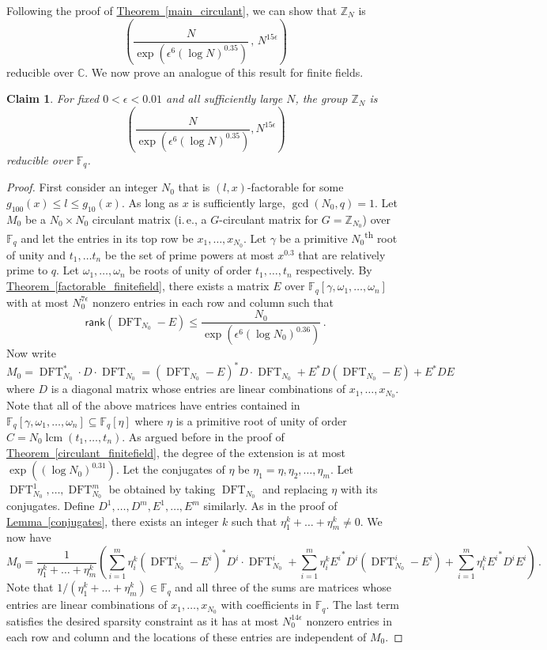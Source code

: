 \documentclass[11pt]{article}
\numberwithin{equation}{section}
\newtheorem{claim}[theorem]{Claim}
\theoremstyle{definition}
\theoremstyle{plain}
\newcommand{\C}{\mathbb C}
\newcommand{\Z}{\mathbb Z}
\newcommand{\ie}{i.\,e.}
\newcommand{\expref}[2]{\hyperref[#2]{#1~\ref{#2}}}
\theoremstyle{definition}
\newcommand\F{{\mathbb{F}}}
\renewcommand\Z{{\mathbb{Z}}}
\renewcommand\C{{\mathbb{C}}}
\newcommand\rank{\textsf{rank}}
\DeclareMathOperator{\lcm}{lcm}
\newcommand{\ts}{\textsuperscript}
\DeclareMathOperator{\DFT}{DFT}
\begin{document}
Following the proof of \expref{Theorem}{main_circulant}, 
we can show that $\Z_N$ is 
\[
\left(\frac{N}{\exp\left(\epsilon^6(\log N)^{0.35}\right)}\,,\,N^{15 \epsilon} \right)
\]
reducible over $\C$.  We now prove an analogue of this result for finite fields.
\begin{claim}\label{main_stronger}
For fixed $0 < \epsilon < 0.01$ and all sufficiently large $N$, the group $\Z_N$ is
\[
\left( \frac{N}{\exp\left(\epsilon^6(\log N)^{0.35}\right)},  N^{15 \epsilon}\right) 
\]
reducible over $\F_q$.
\end{claim}
\begin{proof}
  First consider an integer $N_0$ that is $(l,x)$-factorable for some $
g_{100}(x) \leq l \leq g_{10}(x)$.  As long as $x$ is sufficiently large, $\gcd(N_0,q) = 1$.  Let $M_0$ be a $N_0 \times N_0$ circulant matrix (\ie, a
%
$G$-circulant    %
matrix for
%
$G=\Z_{N_0}$)  %
over $\F_q$ and 
%
let the entries in its top row be %
$x_1, \dots , x_{N_0}$.  Let $\gamma$ be a primitive $N_0$\ts{th} root of unity and $t_1, \dots t_n$ be the set of prime powers at most $x^{0.3}$ that are relatively prime to $q$.  Let $\omega_1, \dots , \omega_n$ be roots of unity of order $t_1, \dots , t_n$ respectively.  By \expref{Theorem}{factorable_finitefield}, there exists a matrix $E$ over $\F_q[\gamma, \omega_1, \dots , \omega_n]$ with at most $N_0^{7\epsilon}$ nonzero entries in each row and column such that 
%
%
%
%
\[
\rank(\DFT_{N_0} - E) \leq \frac{N_0}{\exp\left(\epsilon^6(\log N_0)^{0.36}\right)} \,.
\]
%
Now write
%
%
%
%
\[
M_0 = \DFT_{N_0}^* \cdot D \cdot \DFT_{N_0} = (\DFT_{N_0} - E)^*  D \cdot \DFT_{N_0} + E^*D(\DFT_{N_0} - E) + E^*DE
\]
%
where $D$ is a diagonal matrix whose entries are linear combinations of $x_1,\dots , x_{N_0}$.  Note that all of the above matrices have entries contained in $\F_q[\gamma, \omega_1, \dots , \omega_n] \subseteq \F_q[\eta]$ where $\eta$ is a primitive root of unity of order $C = N_0\lcm(t_1, \dots , t_n)$.  As argued before in the proof of \expref{Theorem}{circulant_finitefield}, the degree of the extension is at most $\exp\left((\log N_0)^{0.31}\right)$.  Let the conjugates of $\eta$ be $\eta_1 = \eta, \eta_2, \dots , \eta_m$.  Let %
$\DFT_{N_0}^1, \dots , \DFT_{N_0}^m$ 
%
be obtained by taking %
$\DFT_{N_0}$ %
and replacing $\eta$ with its conjugates. Define $D^1, \dots , D^m, E^1, \dots , E^m$ similarly.  As in the proof of \expref{Lemma}{conjugates}, there exists an integer $k$ such that $\eta_1^k +  \dots + \eta_m^k \neq 0$.  We now have
%
%
%
%
\[
M_0 = \frac{1}{\eta_1^k + \dots + \eta_m^k}\left(\sum_{i=1}^m \eta_i^k(\DFT_{N_0}^i - E^i)^*D^i \cdot \DFT_{N_0}^i + \sum_{i=1}^m \eta_i^k{E^i}^*D^i(\DFT_{N_0}^i - E^i) + \sum_{i=1}^m \eta_i^k{E^i}^*D^iE^i\right) \,.
\]
%
Note that $1/(\eta_1^k + \dots + \eta_m^k) \in \F_q$ and all three of the sums are matrices whose entries are linear combinations of $x_1, \dots , x_{N_0}$ with coefficients in $\F_q$.  The last term satisfies the desired sparsity constraint as it has at most $N_0^{14 \epsilon}$ nonzero entries in each row and column and the locations of these entries are independent of $M_0$.  


\end{proof}
\end{document}
